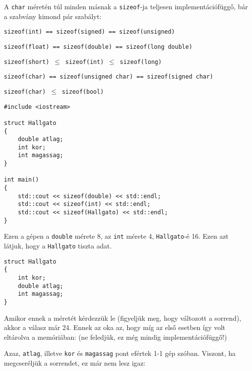 \documentclass[a4paper,11.5pt]{article}
\begin{document}
	\medskip
	A \texttt{char} méretén túl minden másnak a \texttt{sizeof}-ja teljesen implementációfüggő, bár a szabvány kimond pár szabályt:
	\begin{center}
		\texttt{sizeof(int) == sizeof(signed) == sizeof(unsigned)}
		\smallskip
		
		\texttt{sizeof(float) == sizeof(double) == sizeof(long double)}
		\smallskip
		
		\texttt{sizeof(short) $\leq$ sizeof(int) $\leq$ sizeof(long)}
		\smallskip
		
		\texttt{sizeof(char) == sizeof(unsigned char) == sizeof(signed char)}
		\smallskip
		
		\texttt{sizeof(char) $\leq$ sizeof(bool)}
		\smallskip
	\end{center}
	\begin{lstlisting}
#include <iostream>

struct Hallgato
{
	double atlag;
	int kor;
	int magassag;
}

int main()
{
	std::cout << sizeof(double) << std::endl;
	std::cout << sizeof(int) << std::endl;
	std::cout << sizeof(Hallgato) << std::endl;
}
	\end{lstlisting}
	Ezen a gépen a \texttt{double} mérete 8, az \texttt{int} mérete 4, \texttt{Hallgato}-é 16. Ezen azt látjuk, hogy a \texttt{Hallgato} tiszta adat.
	\begin{lstlisting}
struct Hallgato
{
	int kor;
	double atlag;
	int magassag;
}
	\end{lstlisting} 
	Amikor ennek a méretét kérdezzük le (figyeljük meg, hogy változott a sorrend), akkor a válasz már 24. Ennek az oka az, hogy míg az első esetben így volt eltárolva a memóriában: (ne feledjük, ez még mindig implementációfüggő!)
	\begin{center}
	\end{center}
	Azaz, \texttt{atlag}, illetve \texttt{kor} és \texttt{magassag} pont efértek 1-1 gép szóban. Viszont, ha megcseréljük a sorrendet, ez már nem lesz igaz:
\end{document}
